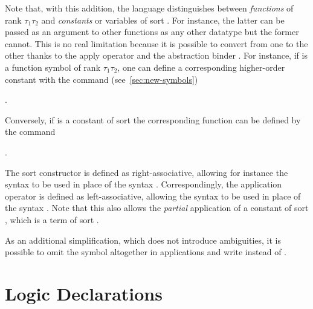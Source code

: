 \begin{newver}
Note that, with this addition, the language distinguishes 
between \emph{functions} of rank $\tau_1\tau_2$
and \emph{constants} or variables of sort .
For instance, the latter can be passed as an argument to other functions 
as any other datatype but the former cannot.
This is no real limitation because it is possible to convert from one to the other
thanks to the apply operator \ter{\_} and the abstraction binder .
For instance, if  is a function symbol of rank $\tau_1\tau_2$,
one can define a corresponding higher-order constant with the command 
(see~\ref{sec:new-symbols}) 
\begin{center}
 .
\end{center}
%
Conversely, if  is a constant of sort 
the corresponding function can be defined by the command 
\begin{center}
 .
\end{center}

The \ter{->} sort constructor is defined as right-associative, 
allowing for instance the syntax
 to be used in place of the syntax
.
Correspondingly, the application operator \ter{\_} is defined as left-associative, 
allowing the syntax
 to be used in place of the syntax
.
Note that this also allows the \emph{partial} application  
of a constant  of sort ,
which is a term of sort .

As an additional simplification, which does not introduce ambiguities,  
it is possible to omit the \ter{\_} symbol altogether in applications and write
 instead of .
\end{newver} 


\section{Logic Declarations} \label{sec:logic-declarations}

